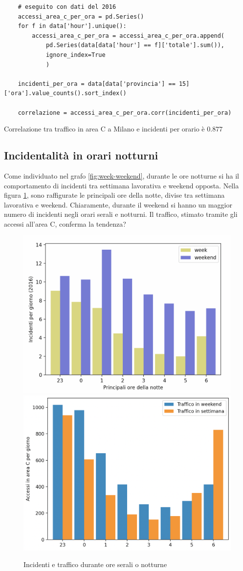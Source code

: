 \documentclass[a4paper]{report}
\begin{document}
\begin{lstlisting}
    # eseguito con dati del 2016
    accessi_area_c_per_ora = pd.Series()
    for f in data['hour'].unique():
        accessi_area_c_per_ora = accessi_area_c_per_ora.append(
            pd.Series(data[data['hour'] == f]['totale'].sum()), 
            ignore_index=True
            )

    incidenti_per_ora = data[data['provincia'] == 15]['ora'].value_counts().sort_index()

    correlazione = accessi_area_c_per_ora.corr(incidenti_per_ora)
\end{lstlisting}

Correlazione tra traffico in area C a Milano e incidenti per orario è $0.877$


\subsection{Incidentalità in orari notturni}

Come individuato nel grafo \ref{fig:week-weekend}, durante le 
ore notturne si ha il comportamento di incidenti tra settimana lavorativa e weekend opposta.
Nella figura \ref{fig:ore-notte}, sono raffigurate le principali ore della notte, divise tra 
settimana lavorativa e weekend.
Chiaramente, durante il weekend si hanno un maggior numero di incidenti 
negli orari serali e notturni.
Il traffico, stimato tramite gli accessi all'area C, conferma la tendenza?

\begin{figure}
    \includegraphics[width=0.5\linewidth]{../src/incidenti/incidenti_senza_coords/ore_punta/ore_notte.png}
    \includegraphics[width=0.5\linewidth]{../src/area_c/traffico_serale.png}
    \caption{Incidenti e traffico durante ore serali o notturne}
    \label{fig:ore-notte}
\end{figure}
\end{document}
